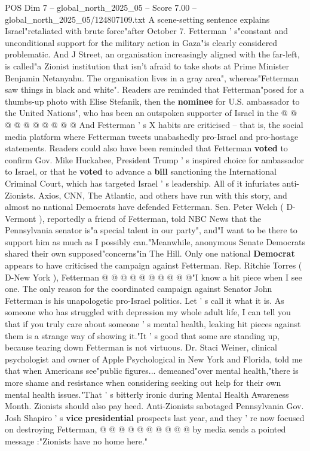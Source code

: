 \begin{textsample}{POS Dim 7 – global\_north\_2025\_05 – Score 7.00 – global\_north\_2025\_05/124807109.txt}
A scene-setting sentence explains Israel"retaliated with brute force"after October 7.
Fetterman ' s"constant and unconditional support for the military action in Gaza"is clearly considered problematic.
And J Street, an organisation increasingly aligned with the far-left, is called"a Zionist institution that isn't afraid to take shots at Prime Minister Benjamin Netanyahu.
The organisation lives in a gray area", whereas"Fetterman saw things in black and white".
Readers are reminded that Fetterman"posed for a thumbs-up photo with Elise Stefanik, then the \textbf{nominee} for U.S. ambassador to the United Nations", who has been an outspoken supporter of Israel in the @ @ @ @ @ @ @ @ @ @ And Fetterman ' s X habits are criticised -- that is, the social media platform where Fetterman tweets unabashedly pro-Israel and pro-hostage statements.
Readers could also have been reminded that Fetterman \textbf{voted} to confirm Gov.
Mike Huckabee, President Trump ' s inspired choice for ambassador to Israel, or that he \textbf{voted} to advance a \textbf{bill} sanctioning the International Criminal Court, which has targeted Israel ' s leadership.
All of it infuriates anti-Zionists.
Axios, CNN, The Atlantic, and others have run with this story, and almost no national Democrats have defended Fetterman.
Sen.
Peter Welch ( D-Vermont ), reportedly a friend of Fetterman, told NBC News that the Pennsylvania senator is"a special talent in our party", and"I want to be there to support him as much as I possibly can."Meanwhile, anonymous Senate Democrats shared their own supposed"concerns"in The Hill.
Only one national \textbf{Democrat} appears to have criticised the campaign against Fetterman.
Rep.
Ritchie Torres ( D-New York ), Fetterman @ @ @ @ @ @ @ @ @ @"I know a hit piece when I see one.
The only reason for the coordinated campaign against Senator John Fetterman is his unapologetic pro-Israel politics.
Let ' s call it what it is.
As someone who has struggled with depression my whole adult life, I can tell you that if you truly care about someone ' s mental health, leaking hit pieces against them is a strange way of showing it."It ' s good that some are standing up, because tearing down Fetterman is not virtuous.
Dr.
Staci Weiner, clinical psychologist and owner of Apple Psychological in New York and Florida, told me that when Americans see"public figures... demeaned"over mental health,"there is more shame and resistance when considering seeking out help for their own mental health issues."That ' s bitterly ironic during Mental Health Awareness Month.
Zionists should also pay heed.
Anti-Zionists sabotaged Pennsylvania Gov.
Josh Shapiro ' s \textbf{vice} \textbf{presidential} prospects last year, and they ' re now focused on destroying Fetterman, @ @ @ @ @ @ @ @ @ @ by media sends a pointed message :"Zionists have no home here."

\end{textsample}
